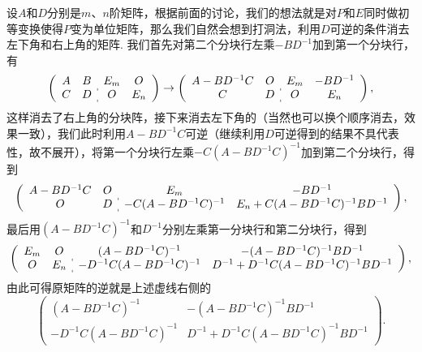 \begin{solution}
    设$A$和$D$分别是$m$、$n$阶矩阵，根据前面的讨论，我们的想法就是对$P$和$E$同时做初等变换使得$P$变为单位矩阵，那么我们自然会想到打洞法，利用$D$可逆的条件消去左下角和右上角的矩阵. 我们首先对第二个分块行左乘$-BD^{-1}$加到第一个分块行，有
    \[\left(\begin{array}{cc:cc}
                A & B & E_m & O \\ C & D & O & E_n
            \end{array}\right)\rightarrow\left(\begin{array}{cc:cc}
                A-BD^{-1}C & O & E_m & -BD^{-1} \\ C & D & O & E_n
            \end{array}\right),\]
    这样消去了右上角的分块阵，接下来消去左下角的（当然也可以换个顺序消去，效果一致），我们此时利用$A-BD^{-1}C$可逆（继续利用$D$可逆得到的结果不具代表性，故不展开），将第一个分块行左乘$-C(A-BD^{-1}C)^{-1}$加到第二个分块行，得到
    \[\left(\begin{array}{cc:cc}
                A-BD^{-1}C & O & E_m & -BD^{-1} \\ O & D & -C(A-BD^{-1}C)^{-1} & E_n+C(A-BD^{-1}C)^{-1}BD^{-1}
            \end{array}\right),\]
    最后用$(A-BD^{-1}C)^{-1}$和$D^{-1}$分别左乘第一分块行和第二分块行，得到
    \[\left(\begin{array}{cc:cc}
                E_m & O & (A-BD^{-1}C)^{-1} & -(A-BD^{-1}C)^{-1}BD^{-1} \\ O & E_n & -D^{-1}C(A-BD^{-1}C)^{-1} & D^{-1}+D^{-1}C(A-BD^{-1}C)^{-1}BD^{-1}
            \end{array}\right),\]
    由此可得原矩阵的逆就是上述虚线右侧的
    \[\begin{pmatrix}
            (A-BD^{-1}C)^{-1} & -(A-BD^{-1}C)^{-1}BD^{-1} \\ -D^{-1}C(A-BD^{-1}C)^{-1} & D^{-1}+D^{-1}C(A-BD^{-1}C)^{-1}BD^{-1}
        \end{pmatrix}.\]
\end{solution}

